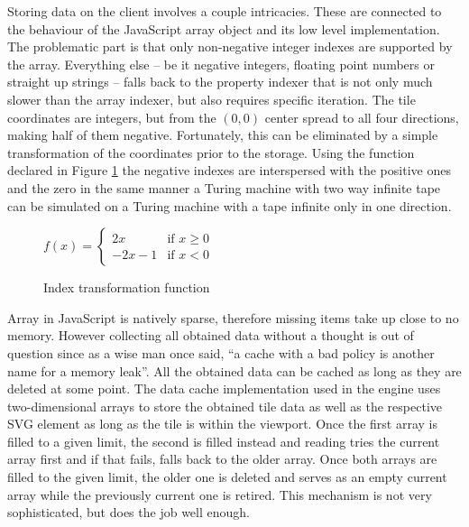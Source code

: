 \documentclass[11pt,oneside, final]{fithesis2}
\begin{document}
Storing data on the client involves a couple intricacies. These are connected to the behaviour of the JavaScript array object and its low level implementation. The problematic part is that only non-negative integer indexes are supported by the array\cite{ecma}. Everything else -- be it negative integers, floating point numbers or straight up strings -- falls back to the property indexer that is not only much slower than the array indexer, but also requires specific iteration. The tile coordinates are integers, but from the $(0,0)$ center spread to all four directions, making half of them negative. Fortunately, this can be eliminated by a simple transformation of the coordinates prior to the storage. Using the function declared in Figure \ref{indextransformation} the negative indexes are interspersed with the positive ones and the zero in the same manner a Turing machine with two way infinite tape can be simulated on a Turing machine with a tape infinite only in one direction.

\begin{figure}[h]
\centering
\begin{math}
f(x) = 
\left\{
	\begin{array}{ll}
		2x  & \mbox{if } x \geq 0\\
		-2x - 1 & \mbox{if } x < 0
	\end{array}
\right.
\end{math}
\caption{Index transformation function}
\label{indextransformation}
\end{figure}

Array in JavaScript is natively sparse, therefore missing items take up close to no memory\cite{javascriptarray}. However collecting all obtained data without a thought is out of question since as a wise man once said, ``a cache with a bad policy is another name for a memory leak''\cite{chen}. All the obtained data can be cached as long as they are deleted at some point. The data cache implementation used in the engine uses two-dimensional arrays to store the obtained tile data as well as the respective SVG element as long as the tile is within the viewport. Once the first array is filled to a given limit, the second is filled instead and reading tries the current array first and if that fails, falls back to the older array. Once both arrays are filled to the given limit, the older one is deleted and serves as an empty current array while the previously current one is retired. This mechanism is not very sophisticated, but does the job well enough.
\end{document}
